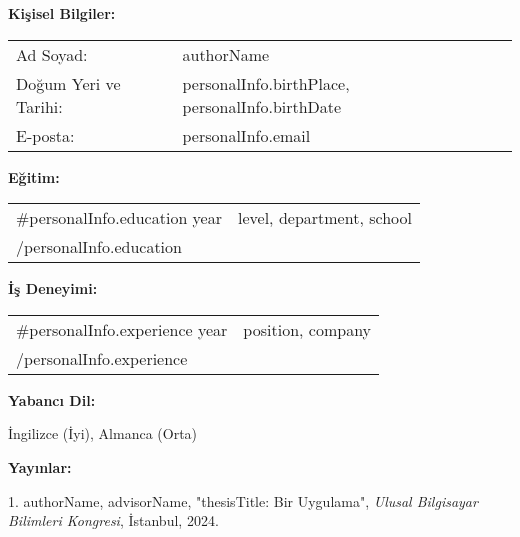 \documentclass[12pt,a4paper,oneside]{report}
\begin{document}
\singlespacing %

\textbf{Kişisel Bilgiler:}

\begin{tabular}{@{}ll@{}}
Ad Soyad: & {{authorName}} \\
Doğum Yeri ve Tarihi: & {{personalInfo.birthPlace}}, {{personalInfo.birthDate}} \\
E-posta: & {{personalInfo.email}} \\
\end{tabular}

\vspace{0.5cm}

\textbf{Eğitim:}

\begin{tabular}{@{}ll@{}}
{{#personalInfo.education}}
{{year}} & {{level}}, {{department}}, {{school}} \\
{{/personalInfo.education}}
\end{tabular}

\vspace{0.5cm}

\textbf{İş Deneyimi:}

\begin{tabular}{@{}ll@{}}
{{#personalInfo.experience}}
{{year}} & {{position}}, {{company}} \\
{{/personalInfo.experience}}
\end{tabular}

\vspace{0.5cm}

\textbf{Yabancı Dil:}

İngilizce (İyi), Almanca (Orta)

\textbf{Yayınlar:}

1. {{authorName}}, {{advisorName}}, "{{thesisTitle}}: Bir Uygulama", \textit{Ulusal Bilgisayar Bilimleri Kongresi}, İstanbul, 2024.
\end{document}

